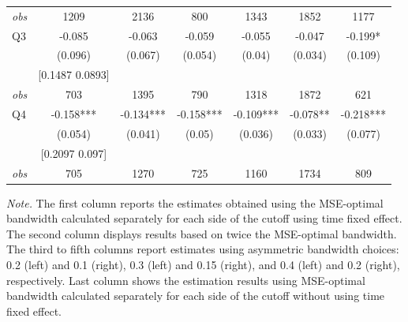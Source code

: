 \begin{table}[]
{\begin{tabular}{lcccccc}
\textit{obs} & 1209 & 2136 & 800 & 1343 & 1852 & 1177 \\ 
Q3 & -0.085 & -0.063 & -0.059 & -0.055 & -0.047 & -0.199* \\ 
&(0.096)&(0.067) & (0.054)&(0.04)&(0.034)&(0.109)\\ 
& [0.1487 0.0893] & & & & & \\ 
\textit{obs} & 703 & 1395 & 790 & 1318 & 1872 & 621 \\ 
Q4 & -0.158*** & -0.134*** & -0.158*** & -0.109*** & -0.078** & -0.218*** \\ 
&(0.054)&(0.041) & (0.05)&(0.036)&(0.033)&(0.077)\\ 
& [0.2097 0.097] & & & & & \\ 
\textit{obs} & 705 & 1270 & 725 & 1160 & 1734 & 809 \\ 
\hline 
\end{tabular}}{\textit{Note.} The first column reports the estimates obtained using the MSE-optimal bandwidth calculated separately for each side of the cutoff using time fixed effect. The second column displays results based on twice the MSE-optimal bandwidth. The third to fifth columns report estimates using asymmetric bandwidth choices: 0.2 (left) and 0.1 (right), 0.3 (left) and 0.15 (right), and 0.4 (left) and 0.2 (right), respectively. Last column shows the estimation results using MSE-optimal bandwidth calculated separately for each side of the cutoff without using time fixed effect.}
\end{table}


